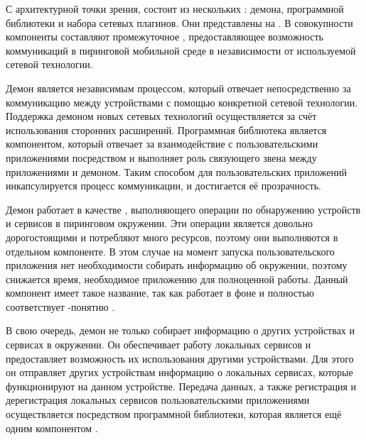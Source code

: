 %
С архитектурной точки зрения,  состоит из нескольких : демона, программной библиотеки и набора сетевых плагинов.
%
Они представлены на . 
%
В совокупности компоненты составляют промежуточное , предоставляющее возможность коммуникаций в пиринговой мобильной среде в независимости от используемой сетевой технологии.


%
Демон  является независимым процессом, который отвечает непосредственно за коммуникацию между устройствами с помощью конкретной сетевой технологии.
%
Поддержка демоном новых сетевых технологий осуществляется за счёт использования сторонних расширений.
%
Программная библиотека  является компонентом, который отвечает за взаимодействие с пользовательскими приложениями посредством  и выполняет роль связующего звена между приложениями и демоном.
%
Таким способом для пользовательских приложений инкапсулируется процесс коммуникации, и достигается её прозрачность.

%
Демон  работает в качестве , выполняющего операции по обнаружению устройств и сервисов в пиринговом окружении.
%
Эти операции является довольно дорогостоящими и потребляют много ресурсов, поэтому они выполняются в отдельном компоненте.
%
В этом случае на момент запуска пользовательского приложения нет необходимости собирать информацию об окружении, поэтому снижается время, необходимое приложению для полноценной работы.
%
Данный компонент имеет такое название, так как работает в фоне и полностью соответствует -понятию  .

%
В свою очередь, демон не только собирает информацию о других устройствах и сервисах в окружении.
%
Он обеспечивает работу локальных сервисов и предоставляет возможность их использования другими устройствами.
%
Для этого он отправляет других устройствам информацию о локальных сервисах, которые функционируют на данном устройстве.
%
Передача данных, а также регистрация и дерегистрация локальных сервисов пользовательскими приложениями осуществляется посредством программной библиотеки, которая является ещё одним компонентом .

